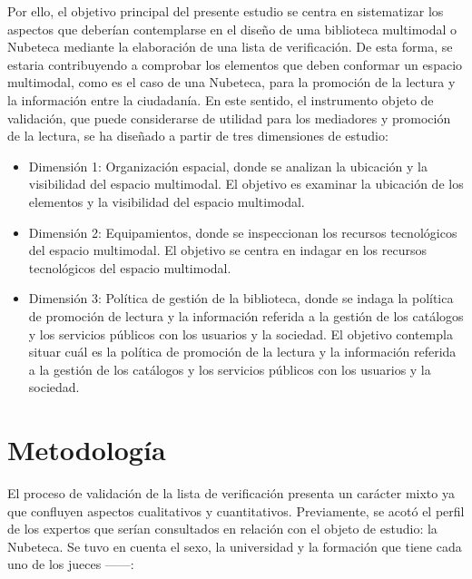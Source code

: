 \documentclass[spanish]{textolivre}
\begin{document}
Por ello, el objetivo principal del presente estudio se centra en sistematizar los aspectos que deberían contemplarse en el diseño de uma biblioteca multimodal o Nubeteca mediante la elaboración de una lista de verificación. De esta forma, se estaria contribuyendo a comprobar los elementos que deben conformar un espacio multimodal, como es el caso de una Nubeteca, para la promoción de la lectura y la información entre la ciudadanía. En este sentido, el instrumento objeto de validación, que puede considerarse de utilidad para los mediadores y promoción de la lectura, se ha  diseñado a partir de  tres dimensiones de estudio:

\begin{itemize}
    \item Dimensión 1: Organización espacial, donde se analizan la ubicación y la visibilidad del espacio multimodal. El objetivo es examinar la ubicación de los elementos y la visibilidad del espacio multimodal.
    \item Dimensión 2: Equipamientos, donde se inspeccionan los recursos tecnológicos del espacio multimodal. El objetivo se centra en indagar en los recursos tecnológicos del espacio multimodal.
    \item Dimensión 3: Política de gestión de la biblioteca, donde se indaga la política de promoción de lectura y la información referida a la gestión de los catálogos y los servicios públicos con los usuarios y la sociedad. El objetivo contempla situar cuál es la política de promoción de la lectura y la información referida a la gestión de los catálogos y los servicios públicos con los usuarios y la sociedad.
\end{itemize}

\section{Metodología}\label{sec-normas}
El proceso de validación de la lista de verificación \cite{lewis_tests_2003} presenta un carácter mixto ya que confluyen aspectos cualitativos y cuantitativos. Previamente, se acotó el perfil de los expertos que serían consultados en relación con el objeto de estudio: la Nubeteca. Se tuvo en cuenta el sexo, la universidad y la formación que tiene cada uno de los jueces ——:
\end{document}
